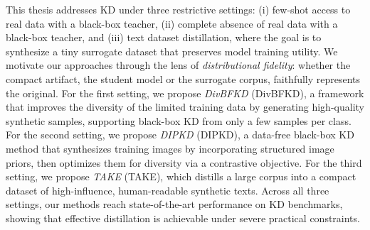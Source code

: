 \begin{foldable}
  This thesis addresses \ac{KD} under three restrictive settings: (i) few-shot access to real data with a black-box teacher, (ii) complete absence of real data with a black-box teacher, and (iii) text dataset distillation, where the goal is to synthesize a tiny surrogate dataset that preserves model training utility.
  We motivate our approaches through the lens of \textit{distributional fidelity}: whether the compact artifact, the student model or the surrogate corpus, faithfully represents the original.
  For the first setting, we propose \textit{\acl{DivBFKD}} (\ac{DivBFKD}), a framework that improves the diversity of the limited training data by generating high-quality synthetic samples, supporting black-box \ac{KD} from only a few samples per class.
  For the second setting, we propose \textit{\acl{DIPKD}} (\ac{DIPKD}), a data-free black-box \ac{KD} method that synthesizes training images by incorporating structured image priors, then optimizes them for diversity via a contrastive objective.
  For the third setting, we propose \textit{\acl{TAKE}} (\ac{TAKE}), which distills a large corpus into a compact dataset of high-influence, human-readable synthetic texts.
  Across all three settings, our methods reach state-of-the-art performance on \ac{KD} benchmarks, showing that effective distillation is achievable under severe practical constraints.
\end{foldable}
